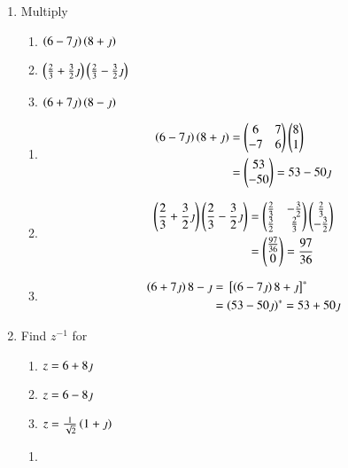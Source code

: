 \renewcommand{\theequation}{\theenumi}

\begin{enumerate}[label=\arabic*.,ref=\thesubsection.\theenumi]
	\item Multiply
		\begin{enumerate}
			\item $\left(6-7\jmath\right)\left(8+\jmath\right)$
			\item $\left(\frac{2}{3}+\frac{3}{2}\jmath\right)\left(\frac{2}{3}-\frac{3}{2}\jmath\right)$
			\item $\left(6+7\jmath\right)\left(8-\jmath\right)$
		\end{enumerate}
		\solution 
		\begin{enumerate}
			\item 
				\begin{align}
					\left(6-7\jmath\right)\left(8+\jmath\right) &= \begin{pmatrix}6 & 7 \\ -7 & 6\end{pmatrix}\begin{pmatrix}8 \\ 1\end{pmatrix}
					\\
					&= \begin{pmatrix}53 \\ -50\end{pmatrix} = 53 - 50 \jmath
				\end{align}
			\item 
				\begin{align}
					\left(\frac{2}{3}+\frac{3}{2}\jmath\right)\left(\frac{2}{3}-\frac{3}{2}\jmath\right) &= \begin{pmatrix}\frac{2}{3} & -\frac{3}{2}\\ \frac{3}{2} &\frac{2}{3}\end{pmatrix}\begin{pmatrix}\frac{2}{3} \\ -\frac{3}{2}\end{pmatrix}
					\\
					&=\begin{pmatrix}\frac{97}{36} \\ 0\end{pmatrix} = \frac{97}{36}
				\end{align}
			\item
				\begin{align}
					\left(6+7\jmath\right){8-\jmath} &= {}\left[\left(6-7\jmath\right){8+\jmath}\right]^{*}
					\\
					&= \left(53 - 50 \jmath\right)^{*} = 53 + 50 \jmath
				\end{align}
		\end{enumerate}
	\item Find $z^{-1}$ for
		\begin{enumerate}
			\item $z = 6+8\jmath$
			\item $z = 6-8\jmath$
			\item $z = \frac{1}{\sqrt{2}}\left(1+\jmath\right)$
		\end{enumerate}
		\solution
		\begin{enumerate}
			\item 


\end{enumerate}
\end{enumerate}
